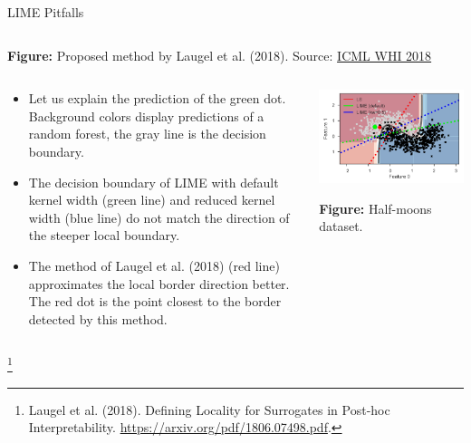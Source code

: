 \documentclass[11pt,compress,t,notes=noshow, xcolor=table]{beamer}
\begin{document}
\begin{vbframe}{LIME Pitfalls}
\begin{columns}
\begin{column}{0.2\textwidth}
		\begin{center}
			\tiny{\textbf{Figure:} Proposed method by Laugel et al. (2018). Source: \href{http://webia.lip6.fr/~laugel/files/WHI_ICML_slides.pdf}{ICML WHI 2018}}
		\end{center}

	
 	\end{column}
\end{columns}
\framebreak
\begin{columns}
	\begin{column}{0.6\textwidth}
		\begin{itemize}
		\item Let us explain the prediction of the green dot. Background colors display predictions of a random forest, the gray line is the decision boundary.
		\item The decision boundary of LIME with default kernel width (green line) and reduced kernel width (blue line) do not match the direction of the steeper local boundary. 
		\item The method of Laugel et al. (2018) (red line) approximates the local border direction better. The red dot is the point closest to the border detected by this method. 
	\end{itemize}
\end{column}
\begin{column}{0.39\textwidth}
\vspace{0.3cm}

	\begin{center}
	\includegraphics[width=1.1\textwidth]{figure/lime-globallocal2}
	
	\vspace{-0.3cm}
	{\tiny \textbf{Figure:} Half-moons dataset.}
	
\end{center}

	\end{column}
\end{columns}
\footnote[frame]{Laugel et al. (2018). Defining Locality for Surrogates in Post-hoc Interpretability. \url{https://arxiv.org/pdf/1806.07498.pdf}.}
\end{vbframe}
\end{document}
